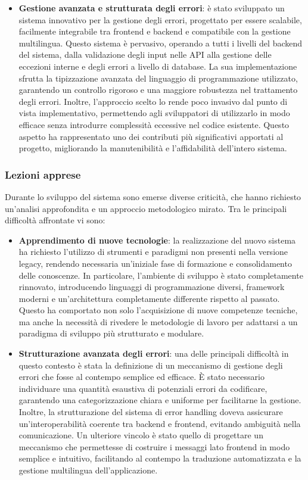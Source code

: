 \begin{itemize}
  \item \textbf{Gestione avanzata e strutturata degli errori}: è stato sviluppato un sistema innovativo per la gestione degli errori, progettato per essere scalabile, facilmente integrabile tra frontend e backend e compatibile con la gestione multilingua. Questo sistema è pervasivo, operando a tutti i livelli del backend del sistema, dalla validazione degli input nelle API alla gestione delle eccezioni interne e degli errori a livello di database. La sua implementazione sfrutta la tipizzazione avanzata del linguaggio di programmazione utilizzato, garantendo un controllo rigoroso e una maggiore robustezza nel trattamento degli errori. Inoltre, l’approccio scelto lo rende poco invasivo dal punto di vista implementativo, permettendo agli sviluppatori di utilizzarlo in modo efficace senza introdurre complessità eccessive nel codice esistente. Questo aspetto ha rappresentato uno dei contributi più significativi apportati al progetto, migliorando la manutenibilità e l'affidabilità dell’intero sistema.
\end{itemize}

\subsubsection{Lezioni apprese}
Durante lo sviluppo del sistema sono emerse diverse criticità, che hanno richiesto un'analisi approfondita e un approccio metodologico mirato. Tra le principali difficoltà affrontate vi sono:

\begin{itemize}
  \item \textbf{Apprendimento di nuove tecnologie}: la realizzazione del nuovo sistema ha richiesto l’utilizzo di strumenti e paradigmi non presenti nella versione legacy, rendendo necessaria un'iniziale fase di formazione e consolidamento delle conoscenze. In particolare, l’ambiente di sviluppo è stato completamente rinnovato, introducendo linguaggi di programmazione diversi, framework moderni e un'architettura completamente differente rispetto al passato. Questo ha comportato non solo l'acquisizione di nuove competenze tecniche, ma anche la necessità di rivedere le metodologie di lavoro per adattarsi a un paradigma di sviluppo più strutturato e modulare.

  \item \textbf{Strutturazione avanzata degli errori}: una delle principali difficoltà in questo contesto è stata la definizione di un meccanismo di gestione degli errori che fosse al contempo semplice ed efficace. È stato necessario individuare una quantità esaustiva di potenziali errori da codificare, garantendo una categorizzazione chiara e uniforme per facilitarne la gestione. Inoltre, la strutturazione del sistema di error handling doveva assicurare un'interoperabilità coerente tra backend e frontend, evitando ambiguità nella comunicazione. Un ulteriore vincolo è stato quello di progettare un meccanismo che permettesse di costruire i messaggi lato frontend in modo semplice e intuitivo, facilitando al contempo la traduzione automatizzata e la gestione multilingua dell’applicazione.
\end{itemize}

